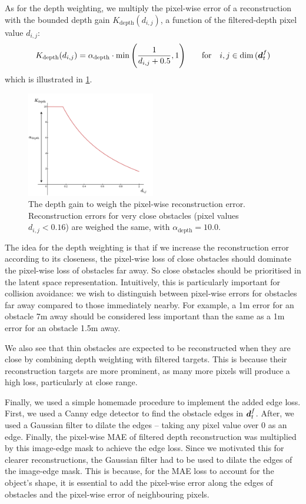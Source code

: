 As for the depth weighting, we multiply the pixel-wise error of a reconstruction with the bounded depth gain $K_{\text{depth}}(d_{i,j})$, a function of the filtered-depth pixel value $d_{i,j}$:
\begin{equation}
    K_{\text{depth}}(d_{i,j}) = \alpha_\text{depth} \cdot \min \Bigg(\frac{1}{d_{i,j} + 0.5}, 1\Bigg) \qquad \text{for} \quad  i, j \in \dim \, ({\boldsymbol{d}}_t^f)
    \label{eq:5_depth_gain}
\end{equation}
which is illustrated in \cref{fig:5_depth_gain}.
\begin{figure}[hbt]
    \centering
    \includegraphics[width=0.5\textwidth]{figures/5_/5_depth_gain.pdf}
    \caption{The depth gain to weigh the pixel-wise reconstruction error. Reconstruction errors for very close obstacles (pixel values $d_{i,j}<0.16$) are weighed the same, with $\alpha_\text{depth} = 10.0$.}
    \label{fig:5_depth_gain}
\end{figure}
The idea for the depth weighting is that if we increase the reconstruction error according to its closeness, the pixel-wise loss of close obstacles should dominate the pixel-wise loss of obstacles far away. So close obstacles should be prioritised in the latent space representation.
Intuitively, this is particularly important for collision avoidance: we wish to distinguish between pixel-wise errors for obstacles far away compared to those immediately nearby. For example, a 1m error for an obstacle 7m away should be considered less important than the same as a 1m error for an obstacle 1.5m away.

We also see that thin obstacles are expected to be reconstructed when they are close by combining depth weighting with filtered targets. This is because their reconstruction targets are more prominent, as many more pixels will produce a high loss, particularly at close range.

Finally, we used a simple homemade procedure to implement the added edge loss. First, we used a Canny edge detector \cite{canny_edge_detection} to find the obstacle edges in ${\boldsymbol{d}}_t^f$. After, we used a Gaussian filter to dilate the edges -- taking any pixel value over 0 as an edge. Finally, the pixel-wise MAE of filtered depth reconstruction was multiplied by this image-edge mask to achieve the edge loss. Since we motivated this for clearer reconstructions, the Gaussian filter had to be used to dilate the edges of the image-edge mask. This is because, for the MAE loss to account for the object's shape, it is essential to add the pixel-wise error along the edges of obstacles and the pixel-wise error of neighbouring pixels. 


